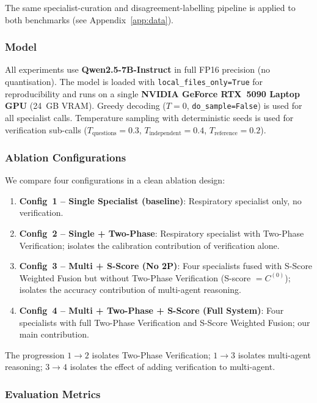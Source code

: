 \documentclass[10pt]{article}
\begin{document}
The same specialist-curation and disagreement-labelling pipeline is applied
to both benchmarks (see Appendix~\ref{app:data}).

\subsubsection{Model}

All experiments use \textbf{Qwen2.5-7B-Instruct} \citep{qwen2025qwen25} in
full FP16 precision (no quantisation).  The model is loaded with
\texttt{local\_files\_only=True} for reproducibility and runs on a single
\textbf{NVIDIA GeForce RTX~5090 Laptop GPU} (24~GB VRAM).  Greedy decoding ($T=0$,
\texttt{do\_sample=False}) is used for all specialist calls.  Temperature
sampling with deterministic seeds is used for verification sub-calls
($T_{\text{questions}}=0.3$, $T_{\text{independent}}=0.4$,
$T_{\text{reference}}=0.2$).

\subsubsection{Ablation Configurations}

We compare four configurations in a clean ablation design:
\begin{enumerate}
    \item \textbf{Config~1 -- Single Specialist (baseline)}: Respiratory
          specialist only, no verification.
    \item \textbf{Config~2 -- Single + Two-Phase}: Respiratory specialist
          with Two-Phase Verification; isolates the calibration contribution
          of verification alone.
    \item \textbf{Config~3 -- Multi + S-Score (No 2P)}: Four specialists
          fused with S-Score Weighted Fusion but without Two-Phase
          Verification (S-score $= C^{(0)}$); isolates the accuracy
          contribution of multi-agent reasoning.
    \item \textbf{Config~4 -- Multi + Two-Phase + S-Score (Full System)}:
          Four specialists with full Two-Phase Verification and S-Score
          Weighted Fusion; our main contribution.
\end{enumerate}

The progression $1\!\to\!2$ isolates Two-Phase Verification;
$1\!\to\!3$ isolates multi-agent reasoning;
$3\!\to\!4$ isolates the effect of adding verification to multi-agent.

\subsubsection{Evaluation Metrics}
\end{document}
